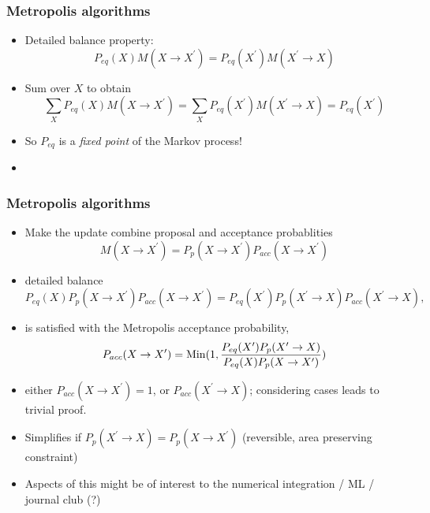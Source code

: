 \documentclass[pdf,ps,8pt]{beamer}
\begin{document}
\begin{frame}[fragile]\small\frametitle{Metropolis algorithms}
  \begin{itemize}
  \item Detailed balance property:
$$
P_{eq}(X) M(X\to X^\prime) = P_{eq}(X^\prime) M(X^\prime\to X)
$$
\item Sum over $X$ to obtain
$$
\sum\limits_X P_{eq}(X) M(X\to X^\prime) = \sum\limits_X P_{eq}(X^\prime) M(X^\prime\to X)= P_{eq}(X^\prime) 
$$
\item So $P_{eq}$ is a \emph{fixed point} of the Markov process!
\item {}
\end{itemize}
\end{frame}

\begin{frame}[fragile]\small\frametitle{Metropolis algorithms}
\begin{itemize}
\item Make the update combine proposal and acceptance probablities
$$
M(X\to X^\prime) = P_p(X\to X^\prime) P_{acc}(X\to X^\prime)
$$
\item detailed balance
$$
P_{eq}(X) P_p(X\to X^\prime) P_{acc}(X\to X^\prime) = P_{eq}(X^\prime)  P_p(X^\prime\to X) P_{acc}(X^\prime\to X ),
$$
\item is satisfied with the Metropolis acceptance probability, 
$$
P_{acc}(X\to X^\prime) = {\rm Min} ( 1, \frac{P_{eq}(X^\prime)  P_p(X^\prime\to X)}{P_{eq}(X) P_p(X\to X^\prime) } )
$$
\item either $P_{acc}(X\to X^\prime) = 1$, or $P_{acc}(X^\prime\to X)$; considering cases leads to trivial proof.
\item Simplifies if $P_p(X^\prime\to X) = P_p(X\to X^\prime)$ (reversible, area preserving constraint)
\end{itemize}
\begin{center}
\end{center}
\begin{itemize}
\item Aspects of this might be of interest to the numerical integration / ML / journal club (?)
\end{itemize}
\end{frame}
\end{document}
